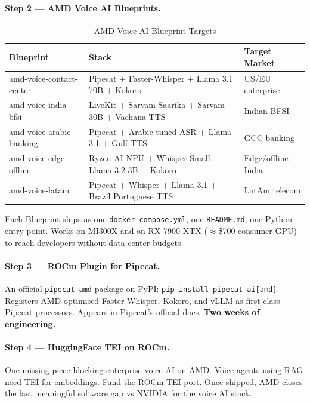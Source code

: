 \documentclass[12pt,a4paper]{article}
\begin{document}
\paragraph{Step 2 --- AMD Voice AI Blueprints.}

\begin{table}[H]\centering
\caption{AMD Voice AI Blueprint Targets}
\label{tab:blueprints}
\small
\begin{tabularx}{\textwidth}{L{3.8cm}L{4.8cm}X}
\toprule
\textbf{Blueprint} & \textbf{Stack} & \textbf{Target Market} \\
\midrule
amd-voice-contact-center & Pipecat + Faster-Whisper + Llama 3.1 70B + Kokoro & US/EU enterprise \\
amd-voice-india-bfsi     & LiveKit + Sarvam Saarika + Sarvam-30B + Vachana TTS & Indian BFSI \\
amd-voice-arabic-banking & Pipecat + Arabic-tuned ASR + Llama 3.1 + Gulf TTS & GCC banking \\
amd-voice-edge-offline   & Ryzen AI NPU + Whisper Small + Llama 3.2 3B + Kokoro & Edge/offline India \\
amd-voice-latam          & Pipecat + Whisper + Llama 3.1 + Brazil Portuguese TTS & LatAm telecom \\
\bottomrule
\end{tabularx}
\end{table}

Each Blueprint ships as one \texttt{docker-compose.yml}, one
\texttt{README.md}, one Python entry point.  Works on MI300X and on RX 7900
XTX ($\approx$\$700 consumer GPU) to reach developers without data center
budgets.

\paragraph{Step 3 --- ROCm Plugin for Pipecat.}
An official \texttt{pipecat-amd} package on PyPI: \texttt{pip install
pipecat-ai[amd]}.  Registers AMD-optimised Faster-Whisper, Kokoro, and vLLM
as first-class Pipecat processors.  Appears in Pipecat's official docs.
\textbf{Two weeks of engineering.}

\paragraph{Step 4 --- HuggingFace TEI on ROCm.}
One missing piece blocking enterprise voice AI on AMD.  Voice agents using
RAG need TEI for embeddings.  Fund the ROCm TEI port.  Once shipped, AMD
closes the last meaningful software gap vs NVIDIA for the voice AI stack.
\end{document}

